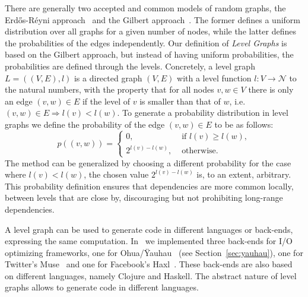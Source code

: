 There are generally two accepted and common models of random graphs, the Erd\H{o}s-R\'{e}yni approach~\cite{erdosreyni} and the Gilbert approach~\cite{gilbert1959random}.
The former defines a uniform distribution over all graphs for a given number of nodes, while the latter defines the probabilities of the edges independently.
Our definition of \emph{Level Graphs} is based on the Gilbert approach, but instead of having uniform probabilities, the probabilities are defined through the levels.
Concretely, a level graph $L = ((V,E),l)$ is a directed graph $(V,E)$ with a level function $l : V \rightarrow \mathcal{N}$ to the natural numbers, with the property that for all nodes $v,w \in V$ there is only an edge $(v,w) \in E$ if the level of $v$ is smaller than that of $w$, i.e. $(v,w) \in E \Rightarrow l(v) < l(w)$.
To generate a probability distribution in level graphs we define the probability of the edge $(v,w) \in E$ to be as follows:
\[  p( (v,w) ) = \left\{
    \begin{array}{ll}
      0, & \text{ if } l(v) \geq l(w), \\
      2^{l(v)-l(w)}, & \text{ otherwise.}
    \end{array} \right. \]
The method can be generalized by choosing a different probability for the case where $l(v) < l(w)$, the chosen value $2^{l(v)-l(w)}$ is, to an extent, arbitrary.
This probability definition ensures that dependencies are more common locally, between levels that are close by, discouraging but not prohibiting long-range dependencies.

A level graph can be used to generate code in different languages or back-ends, expressing the same computation.
In~\cite{goens_multiprog18} we implemented three back-ends for \ac{I/O} optimizing frameworks, one for Ohua/\"{Y}auhau~\cite{ertel_cc18} (see Section~\ref{sec:yauhau}), one for Twitter's Muse~\cite{muse} and one for Facebook's Haxl~\cite{marlow2014haxl}.
These back-ends are also based on different languages, namely Clojure and Haskell.
The abstract nature of level graphs allows to generate code in different languages.